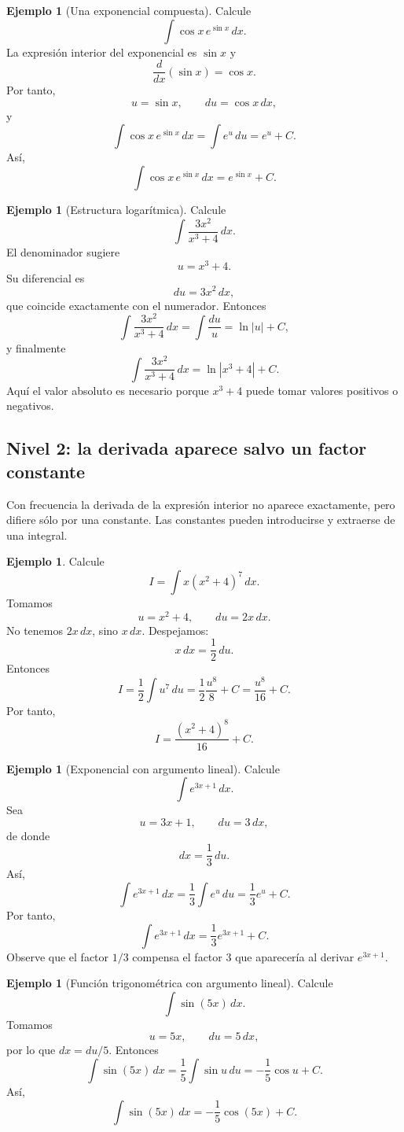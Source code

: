 \documentclass[12pt]{article}
\theoremstyle{definition}
\newtheorem{ejemplo}[teorema]{Ejemplo}
\theoremstyle{remark}
\begin{document}
\begin{ejemplo}[Una exponencial compuesta]
Calcule
\[
\int \cos x\,e^{\sin x}\,dx.
\]
La expresión interior del exponencial es $\sin x$ y
\[
\frac{d}{dx}(\sin x)=\cos x.
\]
Por tanto,
\[
u=\sin x,\qquad du=\cos x\,dx,
\]
y
\[
\int \cos x\,e^{\sin x}\,dx=\int e^u\,du=e^u+C.
\]
Así,
\[
\boxed{\int \cos x\,e^{\sin x}\,dx=e^{\sin x}+C.}
\]
\end{ejemplo}

\begin{ejemplo}[Estructura logarítmica]
Calcule
\[
\int\frac{3x^2}{x^3+4}\,dx.
\]
El denominador sugiere
\[
u=x^3+4.
\]
Su diferencial es
\[
du=3x^2\,dx,
\]
que coincide exactamente con el numerador. Entonces
\[
\int\frac{3x^2}{x^3+4}\,dx=\int\frac{du}{u}=\ln|u|+C,
\]
y finalmente
\[
\boxed{\int\frac{3x^2}{x^3+4}\,dx=\ln|x^3+4|+C.}
\]
Aquí el valor absoluto es necesario porque $x^3+4$ puede tomar valores positivos o negativos.
\end{ejemplo}

\subsection*{Nivel 2: la derivada aparece salvo un factor constante}

Con frecuencia la derivada de la expresión interior no aparece exactamente, pero difiere sólo por una constante. Las constantes pueden introducirse y extraerse de una integral.

\begin{ejemplo}
Calcule
\[
I=\int x(x^2+4)^7\,dx.
\]
Tomamos
\[
u=x^2+4,\qquad du=2x\,dx.
\]
No tenemos $2x\,dx$, sino $x\,dx$. Despejamos:
\[
x\,dx=\frac12\,du.
\]
Entonces
\[
I=\frac12\int u^7\,du
=\frac12\frac{u^8}{8}+C
=\frac{u^8}{16}+C.
\]
Por tanto,
\[
\boxed{I=\frac{(x^2+4)^8}{16}+C.}
\]
\end{ejemplo}

\begin{ejemplo}[Exponencial con argumento lineal]
Calcule
\[
\int e^{3x+1}\,dx.
\]
Sea
\[
u=3x+1,\qquad du=3\,dx,
\]
de donde
\[
dx=\frac13\,du.
\]
Así,
\[
\int e^{3x+1}\,dx
=\frac13\int e^u\,du
=\frac13e^u+C.
\]
Por tanto,
\[
\boxed{\int e^{3x+1}\,dx=\frac13e^{3x+1}+C.}
\]
Observe que el factor $1/3$ compensa el factor $3$ que aparecería al derivar $e^{3x+1}$.
\end{ejemplo}

\begin{ejemplo}[Función trigonométrica con argumento lineal]
Calcule
\[
\int\sin(5x)\,dx.
\]
Tomamos
\[
u=5x,\qquad du=5\,dx,
\]
por lo que $dx=du/5$. Entonces
\[
\int\sin(5x)\,dx
=\frac15\int\sin u\,du
=-\frac15\cos u+C.
\]
Así,
\[
\boxed{\int\sin(5x)\,dx=-\frac15\cos(5x)+C.}
\]
\end{ejemplo}
\end{document}
